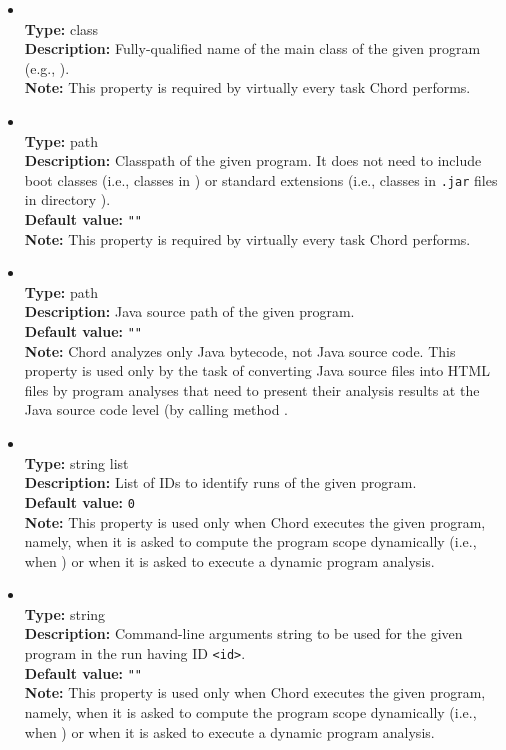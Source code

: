 \begin{itemize}
\item
{} \\
{\bf Type:} class \\
{\bf Description:} Fully-qualified name of the main class of the given program (e.g., ). \\
{\bf Note:} This property is required by virtually every task Chord performs.

\item
{} \\
{\bf Type:} path \\
{\bf Description:} Classpath of the given program.  It does not need to include boot classes (i.e., classes in ) or standard extensions (i.e., classes in {\tt .jar} files in directory ). \\
{\bf Default value:} {\tt ""} \\
{\bf Note:} This property is required by virtually every task Chord performs.

\item
{} \\
{\bf Type:} path \\
{\bf Description:} Java source path of the given program. \\
{\bf Default value:} {\tt ""}  \\
{\bf Note:} Chord analyzes only Java bytecode, not Java source code.  This property is used only by the task of converting Java source files into HTML files by program analyses that need to present their analysis results at the Java source code level (by calling method .

\item
{} \\
{\bf Type:} string list \\
{\bf Description:} List of IDs to identify runs of the given program. \\
{\bf Default value:} {\tt 0} \\
{\bf Note:} This property is used only when Chord executes the given program, namely, when it is asked to compute the program scope dynamically (i.e., when ) or when it is asked to execute a dynamic program analysis.

\item
{} \\
{\bf Type:} string \\
{\bf Description:} Command-line arguments string to be used for the given program in the run having ID {\tt <id>}. \\
{\bf Default value:} {\tt ""} \\
{\bf Note:} This property is used only when Chord executes the given program, namely, when it is asked to compute the program scope dynamically (i.e., when ) or when it is asked to execute a dynamic program analysis.


\end{itemize}

